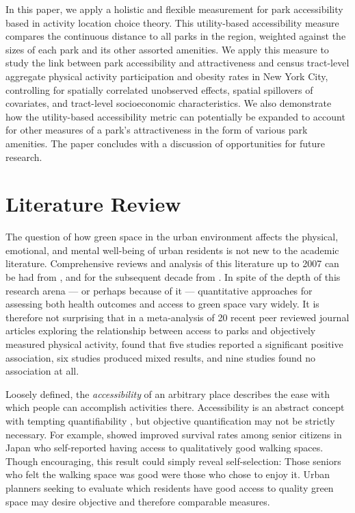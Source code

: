 \documentclass[shortAfour,sageh.bst]{sagej}
\begin{document}
In this paper, we apply a holistic and flexible measurement for park
accessibility based in activity location choice theory. This
utility-based accessibility measure compares the continuous distance to
all parks in the region, weighted against the sizes of each park and its
other assorted amenities. We apply this measure to study the link
between park accessibility and attractiveness and census tract-level
aggregate physical activity participation and obesity rates in New York
City, controlling for spatially correlated unobserved effects, spatial
spillovers of covariates, and tract-level socioeconomic characteristics.
We also demonstrate how the utility-based accessibility metric can
potentially be expanded to account for other measures of a park's
attractiveness in the form of various park amenities. The paper
concludes with a discussion of opportunities for future research.

\hypertarget{literature-review}{%
\section{Literature Review}\label{literature-review}}

\label{sec:litreview} The question of how green space in the urban
environment affects the physical, emotional, and mental well-being of
urban residents is not new to the academic literature. Comprehensive
reviews and analysis of this literature up to 2007 can be had from
\citet{tzoulas2007promoting}, and for the subsequent decade from
\citet{kabisch2015human}. In spite of the depth of this research arena
--- or perhaps because of it --- quantitative approaches for assessing
both health outcomes and access to green space vary widely. It is
therefore not surprising that in a meta-analysis of 20 recent peer
reviewed journal articles exploring the relationship between access to
parks and objectively measured physical activity, \citet{Bancroft2015}
found that five studies reported a significant positive association, six
studies produced mixed results, and nine studies found no association at
all.

Loosely defined, the \emph{accessibility} of an arbitrary place
describes the ease with which people can accomplish activities there.
Accessibility is an abstract concept with tempting quantifiability
\citep{Handy1997}, but objective quantification may not be strictly
necessary. For example, \citet{takano2002urban} showed improved survival
rates among senior citizens in Japan who self-reported having access to
qualitatively good walking spaces. Though encouraging, this result could
simply reveal self-selection: Those seniors who felt the walking space
was good were those who chose to enjoy it. Urban planners seeking to
evaluate which residents have good access to quality green space may
desire objective and therefore comparable measures.
\end{document}
